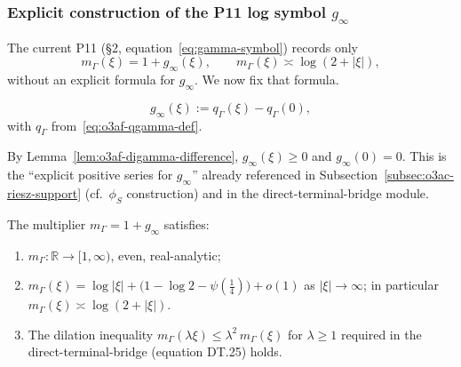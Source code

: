 \subsubsection*{Explicit construction of the P11 log symbol \(g_\infty\)}

The current P11 (§2, equation~\eqref{eq:gamma-symbol}) records only
\[
 m_\Gamma(\xi)=1+g_\infty(\xi),
 \qquad m_\Gamma(\xi)\asymp\log(2+|\xi|),
\]
without an explicit formula for \(g_\infty\).  We now fix that formula.

\begin{definition}
\label{def:o3af-ginfty}
\[
 \boxed{
 g_\infty(\xi)
 :=q_\Gamma(\xi)-q_\Gamma(0),
 }
\tag{O3AF.3}\label{eq:o3af-ginfty}
\]
with \(q_\Gamma\) from~\eqref{eq:o3af-qgamma-def}.
\end{definition}

By Lemma~\ref{lem:o3af-digamma-difference}, \(g_\infty(\xi)\ge0\) and
\(g_\infty(0)=0\).  This is the ``explicit positive series for \(g_\infty\)''
already referenced in Subsection~\ref{subsec:o3ac-riesz-support}
(cf.\ \(\phi_S\) construction) and in the direct-terminal-bridge module.

\begin{proposition}
\label{prop:o3af-symbol-props}
The multiplier \(m_\Gamma=1+g_\infty\) satisfies:
\begin{enumerate}
\item[(i)] \(m_\Gamma:\mathbb R\to[1,\infty)\), even, real-analytic;
\item[(ii)] \(m_\Gamma(\xi)=\log|\xi|+\bigl(1-\log 2-\psi(\tfrac14)\bigr)
   +o(1)\) as \(|\xi|\to\infty\);
   in particular \(m_\Gamma(\xi)\asymp\log(2+|\xi|)\).
\item[(iii)] The dilation inequality \(m_\Gamma(\lambda\xi)\le\lambda^2\,m_\Gamma(\xi)\)
   for \(\lambda\ge1\) required in the direct-terminal-bridge (equation
   DT.25) holds.
\end{enumerate}
\end{proposition}

